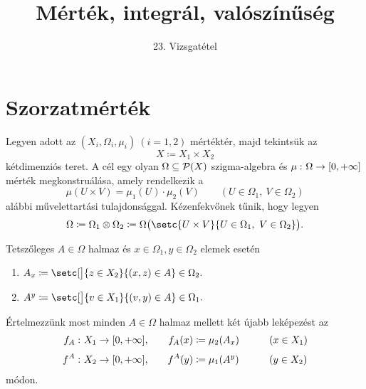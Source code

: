 \documentclass[
]{elteikthesis}[2024/04/26]
\title{Mérték, integrál, valószínűség} %
\subtitle{23. Vizsgatétel}
\begin{document}
	
	
	\section{Szorzatmérték}
	
	Legyen adott az \( (X_i, \Omega_i, \mu_i) \ (i=1,2) \) mértéktér, majd tekintsük az
	\[
		X \coloneq X_1 \times X_2
	\]
	kétdimenziós teret.
	A cél egy olyan \( \Omega \subseteq \mathcal{P}( X ) \) szigma-algebra és 
	\( \mu \,\colon \Omega \to [0, +\infty] \) mérték megkonstruálása,
	amely rendelkezik a
	\[
		\mu(U \times V) = \mu_1(U) \cdot \mu_2(V) 
		\qquad (U \in \Omega_1, \ V \in \Omega_2)
	\]
	alábbi művelettartási tulajdonsággal.
	Kézenfekvőnek tűnik, hogy legyen
	\[
		\Omega \coloneq
		\Omega_1 \otimes \Omega_2 \coloneq
		\Omega \bigl( \setc{ U \times V }{ U \in \Omega_1, \ V \in \Omega_2 } \bigr).
	\]
	
	\begin{statement}{}{}
		Tetszőleges \( A \in \Omega \) halmaz 
		és \( x \in \Omega_1, y \in \Omega_2 \) elemek esetén
		\begin{enumerate}[label=\alph*)]
			\item \( A_x \coloneq \setc[\big]{ z \in X_2 }{ (x, z) \in A } \in \Omega_2. \)
			\item \( A^y \coloneq \setc[\big]{ v \in X_1 }{ (v, y) \in A } \in \Omega_1. \)
		\end{enumerate}
	\end{statement}
	
	\noindent
	Értelmezzünk most minden \( A \in \Omega \) halmaz mellett két újabb leképezést az
	\begin{alignat*}{3}
		f_A \,\colon X_1 \to [0, +\infty],& \quad 
		&{} f_A(x) &\coloneq \mu_2(A_x) \qquad &&(x \in X_1) \\[3pt]
		f^A \,\colon X_2 \to [0, +\infty],& \quad 
		&{} f^A(y) &\coloneq \mu_1(A^y) \qquad &&(y \in X_2)
	\end{alignat*}
	módon.
	
\end{document}
